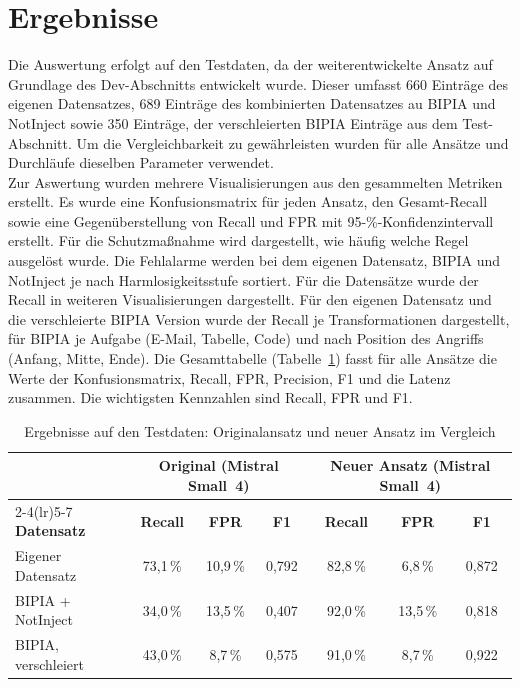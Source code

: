 \section{Ergebnisse}\label{sec:results}

Die Auswertung erfolgt auf den Testdaten, da der weiterentwickelte Ansatz auf Grundlage des Dev-Abschnitts entwickelt wurde. Dieser umfasst 660 Einträge des 
eigenen Datensatzes, 689 Einträge des kombinierten Datensatzes au BIPIA und NotInject sowie 350 Einträge, der verschleierten BIPIA Einträge aus dem Test-Abschnitt.
Um die Vergleichbarkeit zu gewährleisten wurden für alle Ansätze und Durchläufe dieselben Parameter verwendet. \\
Zur Aswertung wurden mehrere Visualisierungen aus den gesammelten Metriken erstellt. Es wurde eine Konfusionsmatrix für jeden Ansatz, den Gesamt-Recall sowie
eine Gegenüberstellung von Recall und FPR mit 95-\%-Konfidenzintervall erstellt. Für die Schutzmaßnahme wird dargestellt, wie häufig welche Regel ausgelöst wurde. Die 
Fehlalarme werden bei dem eigenen Datensatz, BIPIA und NotInject je nach Harmlosigkeitsstufe sortiert. Für die Datensätze wurde der Recall in weiteren 
Visualisierungen dargestellt. Für den eigenen Datensatz und die verschleierte BIPIA Version wurde der Recall je Transformationen dargestellt, für BIPIA je 
Aufgabe (E-Mail, Tabelle, Code) und nach Position des Angriffs (Anfang, Mitte, Ende). Die Gesamttabelle (Tabelle~\ref{tab:ergebnisse}) fasst für alle Ansätze 
die Werte der Konfusionsmatrix, Recall, FPR, Precision, F1 und die Latenz zusammen. Die wichtigsten Kennzahlen sind Recall, FPR und F1.

\begin{table}[htbp]
\centering
\begin{tabular}{l ccc ccc}
\toprule
 & \multicolumn{3}{c}{\textbf{Original (Mistral Small~4)}} & \multicolumn{3}{c}{\textbf{Neuer Ansatz (Mistral Small~4)}} \\
\cmidrule(lr){2-4}\cmidrule(lr){5-7}
\textbf{Datensatz} & \textbf{Recall} & \textbf{FPR} & \textbf{F1} & \textbf{Recall} & \textbf{FPR} & \textbf{F1} \\
\midrule
Eigener Datensatz & 73{,}1\,\% & 10{,}9\,\% & 0{,}792 & 82{,}8\,\% & 6{,}8\,\% & 0{,}872 \\
BIPIA + NotInject & 34{,}0\,\% & 13{,}5\,\% & 0{,}407 & 92{,}0\,\% & 13{,}5\,\% & 0{,}818 \\
BIPIA, verschleiert & 43{,}0\,\% & 8{,}7\,\% & 0{,}575 & 91{,}0\,\% & 8{,}7\,\% & 0{,}922 \\
\bottomrule
\end{tabular}
\caption{Ergebnisse auf den Testdaten: Originalansatz und neuer Ansatz im Vergleich}
\label{tab:ergebnisse}
\end{table}

